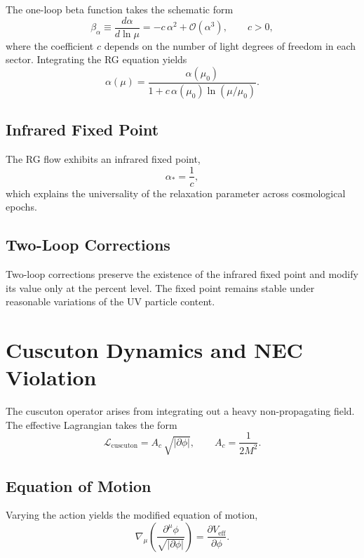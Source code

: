 \documentclass[11pt,a4paper]{article}
\begin{document}
The one-loop beta function takes the schematic form
\begin{equation}
\beta_{\alpha}
    \equiv \frac{d\alpha}{d\ln\mu}
    = -c\,\alpha^{2}
      + \mathcal{O}(\alpha^{3}),
\qquad c > 0,
\end{equation}
where the coefficient \(c\) depends on the number of light degrees of freedom in
each sector. Integrating the RG equation yields
\begin{equation}
\alpha(\mu)
    = \frac{\alpha(\mu_{0})}
           {1 + c\,\alpha(\mu_{0})\ln(\mu/\mu_{0})}.
\end{equation}

\subsection{Infrared Fixed Point}

The RG flow exhibits an infrared fixed point,
\begin{equation}
\alpha_{*} = \frac{1}{c},
\end{equation}
which explains the universality of the relaxation parameter across cosmological
epochs.

\subsection{Two-Loop Corrections}

Two-loop corrections preserve the existence of the infrared fixed point and
modify its value only at the percent level. The fixed point remains stable under
reasonable variations of the UV particle content.

\section{Cuscuton Dynamics and NEC Violation}
\label{app:cuscuton}

The cuscuton operator arises from integrating out a heavy non-propagating field.
The effective Lagrangian takes the form
\begin{equation}
\mathcal{L}_{\mathrm{cuscuton}}
    = A_{c}\,\sqrt{|\partial\phi|},
\qquad
A_{c} = \frac{1}{2M^{2}}.
\end{equation}

\subsection{Equation of Motion}

Varying the action yields the modified equation of motion,
\begin{equation}
\nabla_{\mu}
\left(
    \frac{\partial^{\mu}\phi}
         {\sqrt{|\partial\phi|}}
\right)
= \frac{\partial V_{\mathrm{eff}}}{\partial\phi}.
\end{equation}
\end{document}
